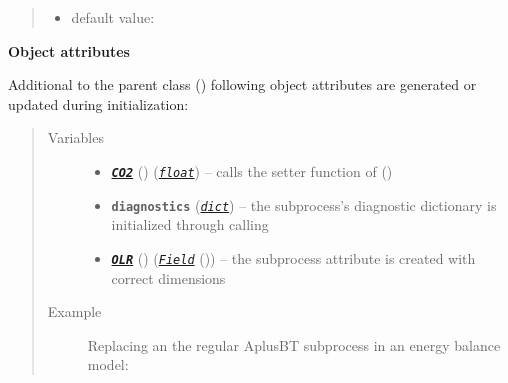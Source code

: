 \documentclass[a4paper,10pt,english]{sphinxmanual}
\begin{document}
\begin{fulllineitems}
\begin{quote}
\begin{description}
\begin{itemize}
\item {} 
default value: 

\end{itemize}


\end{description}\end{quote}

\textbf{Object attributes}

Additional to the parent class {\hyperref[api/climlab.process:climlab.process.energy_budget.EnergyBudget]{\emph{}}} ()
following object attributes are generated or updated during initialization:
\begin{quote}\begin{description}
\item[{Variables}] \leavevmode\begin{itemize}
\item {} 
{\hyperref[api/climlab.radiation:climlab.radiation.AplusBT.AplusBT_CO2.CO2]{\emph{\textbf{\texttt{CO2}}}}} () (\href{http://docs.python.org/2.7/library/functions.html\#float}{\emph{\texttt{float}}}) -- calls the setter function of {\hyperref[api/climlab.radiation:climlab.radiation.AplusBT.AplusBT_CO2.CO2]{\emph{}}} ()

\item {} 
\textbf{\texttt{diagnostics}} (\href{http://docs.python.org/2.7/library/stdtypes.html\#dict}{\emph{\texttt{dict}}}) -- the subprocess's diagnostic dictionary 
 is initialized 
through calling 

\item {} 
{\hyperref[api/climlab.radiation:climlab.radiation.AplusBT.AplusBT.OLR]{\emph{\textbf{\texttt{OLR}}}}} () ({\hyperref[api/climlab.domain:climlab.domain.field.Field]{\emph{\emph{\texttt{Field}}}}} ()) -- the subprocess attribute  is
created with correct dimensions

\end{itemize}

\item[{Example}] \leavevmode
Replacing an the regular AplusBT subprocess in an energy balance model:


\end{description}
\end{quote}
\end{fulllineitems}
\end{document}
